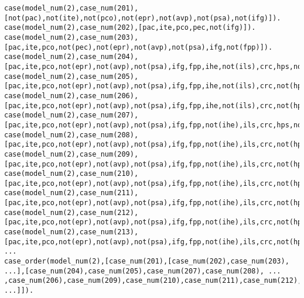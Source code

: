 \documentclass{IOS-Book-Article}
\begin{document}
\begin{lstlisting}[caption={The Chinese copyright infringement case model in Prolog (selection)},captionpos=b,float]
case(model_num(2),case_num(201),[not(pac),not(ite),not(pco),not(epr),not(avp),not(psa),not(ifg)]).
case(model_num(2),case_num(202),[pac,ite,pco,pec,not(ifg)]).
case(model_num(2),case_num(203),[pac,ite,pco,not(pec),not(epr),not(avp),not(psa),ifg,not(fpp)]).
case(model_num(2),case_num(204),[pac,ite,pco,not(epr),not(avp),not(psa),ifg,fpp,ihe,not(ils),crc,hps,not(lps),not(m3fti),not(l3fti),not(cdt),not(fin)]).
case(model_num(2),case_num(205),[pac,ite,pco,not(epr),not(avp),not(psa),ifg,fpp,ihe,not(ils),crc,not(hps),lps,not(m3fti),not(l3fti),not(cdt),not(fin)]).
case(model_num(2),case_num(206),[pac,ite,pco,not(epr),not(avp),not(psa),ifg,fpp,ihe,not(ils),crc,not(hps),not(lps),m3fti,not(l3fti),not(cdt),fin]).
case(model_num(2),case_num(207),[pac,ite,pco,not(epr),not(avp),not(psa),ifg,fpp,not(ihe),ils,crc,hps,not(lps),not(m3fti),not(l3fti),not(cdt),not(fin)]).
case(model_num(2),case_num(208),[pac,ite,pco,not(epr),not(avp),not(psa),ifg,fpp,not(ihe),ils,crc,not(hps),lps,not(m3fti),not(l3fti),not(cdt),not(fin)]).
case(model_num(2),case_num(209),[pac,ite,pco,not(epr),not(avp),not(psa),ifg,fpp,not(ihe),ils,crc,not(hps),not(lps),not(m3fti),not(l3fti),not(cdt),fin]).
case(model_num(2),case_num(210),[pac,ite,pco,not(epr),not(avp),not(psa),ifg,fpp,not(ihe),ils,crc,not(hps),not(lps),not(m3fti),l3fti,not(cdt),fin,cpb,pbt]).
case(model_num(2),case_num(211),[pac,ite,pco,not(epr),not(avp),not(psa),ifg,fpp,not(ihe),ils,crc,not(hps),not(lps),not(m3fti),not(l3fti),cdt,fin,cpb,pbt]).
case(model_num(2),case_num(212),[pac,ite,pco,not(epr),not(avp),not(psa),ifg,fpp,not(ihe),ils,crc,not(hps),not(lps),not(m3fti),l3fti,not(cdt),fin,not(cpb),not(pbt)]).
case(model_num(2),case_num(213),[pac,ite,pco,not(epr),not(avp),not(psa),ifg,fpp,not(ihe),ils,crc,not(hps),not(lps),not(m3fti),not(l3fti),cdt,fin,not(cpb),not(pbt)]).
...
case_order(model_num(2),[case_num(201),[case_num(202),case_num(203), ...],[case_num(204),case_num(205),case_num(207),case_num(208), ... ,case_num(206),case_num(209),case_num(210),case_num(211),case_num(212),case_num(213), ...]]).
\end{lstlisting}

\begin{figure*}[b]
	\scalebox{0.7}{}
\caption{The Chinese copyright infringement model: argument structure (left); in Prolog (right)}
\label{fig:copyright}
\end{figure*}
\end{document}
